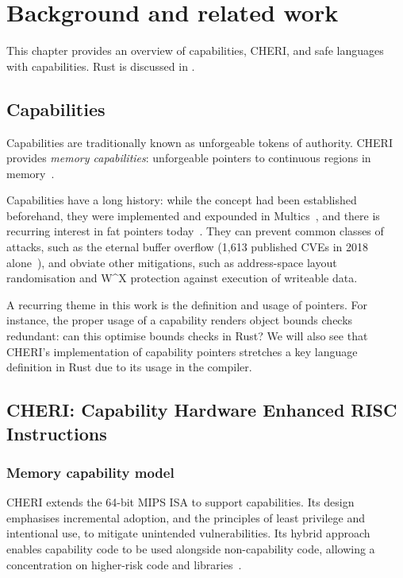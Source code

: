 \documentclass[dissertation.tex]{subfiles}
\begin{document}
\chapter{Background and related work}
\label{ch:bg}



 This chapter provides an overview of capabilities, CHERI,
and safe languages with capabilities.
Rust is discussed in .


\section{Capabilities}
\label{sec:bg-caps}
Capabilities are traditionally known as unforgeable tokens of authority.
CHERI provides \emph{memory capabilities}: unforgeable pointers to
continuous regions in memory~\cite{cheri-risc-2014}.

Capabilities have a long history: while the concept had been established
beforehand, they were implemented and expounded in
Multics~\cite{bell-lapadula}, and there is recurring interest in fat
pointers today~\cite{devietti-hardbound,lowfat-kwon}.
They can prevent common classes of attacks, such as the
eternal buffer overflow (1,613 published CVEs in 2018
alone~\cite{nist-nvd-overflow-2018}), and obviate other mitigations,
such as address-space layout randomisation and W\^{}X protection
against execution of writeable data.

A recurring theme in this work is the definition and usage of pointers.
For instance, the proper usage of a capability renders object bounds
checks redundant: can this optimise bounds checks in Rust?
We will also see that CHERI's implementation of capability pointers
stretches a key language definition in Rust due to its usage in the
compiler.


\section{CHERI: Capability Hardware Enhanced RISC Instructions}

\subsection{Memory capability model}

CHERI extends the 64-bit MIPS ISA to support capabilities.
Its design emphasises incremental adoption, and the principles of least
privilege and intentional use, to mitigate unintended vulnerabilities.
Its hybrid approach enables capability code to be used alongside
non-capability code, allowing a concentration on higher-risk code and
libraries~\cite{cheri-v6}.
\end{document}
